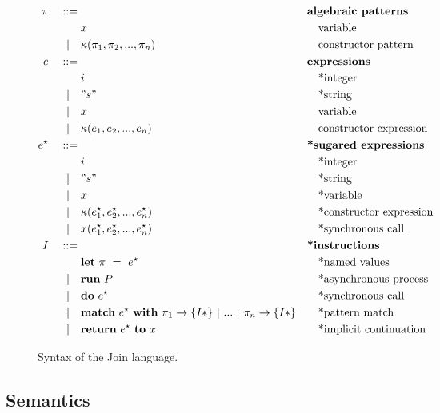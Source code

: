 \begin{figure}
\begin{align*}
\pi\quad ::={}&            && \textbf{algebraic patterns} \\
         & x               && \quad\textrm{variable} \\
\mid\kern-1pt\mid\quad& \kappa(\pi_1, \pi_2, ..., \pi_n)
                           && \quad\textrm{constructor pattern} \\
e\quad ::={}&              && \textbf{expressions} \\
         & i               && \quad\textrm{*integer} \\
\mid\kern-1pt\mid\quad& " s "         && \quad\textrm{*string} \\
\mid\kern-1pt\mid\quad& x               && \quad\textrm{variable} \\
\mid\kern-1pt\mid\quad& \kappa(e_1, e_2, ..., e_n)
                           && \quad\textrm{constructor expression} \\
e^\star\quad ::={}&         && \textbf{*sugared expressions} \\
         & i               && \quad\textrm{*integer} \\
\mid\kern-1pt\mid\quad& " s "         && \quad\textrm{*string} \\
\mid\kern-1pt\mid\quad& x               && \quad\textrm{*variable} \\
\mid\kern-1pt\mid\quad& \kappa(e^\star_1, e^\star_2, ..., e^\star_n)
                           && \quad\textrm{*constructor expression} \\
\mid\kern-1pt\mid\quad& x(e^\star_1, e^\star_2, ..., e^\star_ n)
                           && \quad\textrm{*synchronous call} \\
I\quad ::={}&              && \textbf{*instructions} \\
         & \mathbf{let}~\pi~=~e^\star
                           && \quad\textrm{*named values} \\
\mid\kern-1pt\mid\quad& \mathbf{run}~P  && \quad\textrm{*asynchronous process} \\
\mid\kern-1pt\mid\quad& \mathbf{do}~e^\star && \quad\textrm{*synchronous call} \\
\mid\kern-1pt\mid\quad& \textbf{match}~e^\star~\textbf{with}~\pi_1
               \rightarrow \{ I* \} ~|~ ... ~|~ \pi_n \rightarrow \{ I* \}
                           && \quad\textrm{*pattern match} \\
\mid\kern-1pt\mid\quad& \textbf{return}~e^\star~\textbf{to}~x
                           && \quad\textrm{*implicit continuation}
\end{align*}
\caption{Syntax of the Join language.\label{fig:syntax}}
\end{figure}


\subsection{Semantics}

